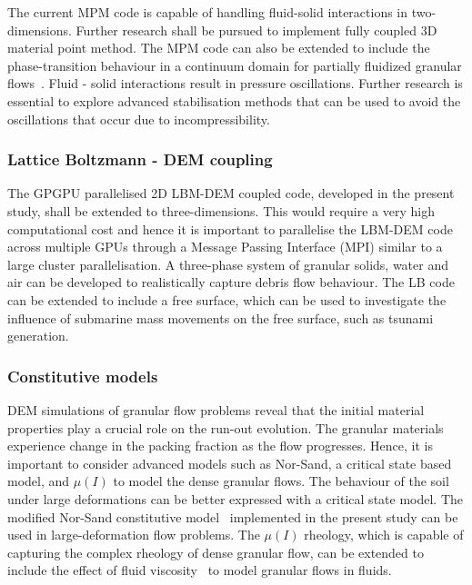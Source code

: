 The current MPM code is capable of handling fluid-solid interactions in 
two-dimensions. Further research shall be pursued to implement fully coupled 3D 
material point method. The MPM code can also be extended to include the 
phase-transition behaviour in a continuum domain for partially fluidized 
granular flows~\citep{Aranson2002, Aranson2001, Volfson2003}. Fluid - solid 
interactions result in pressure oscillations. Further research is essential to 
explore advanced stabilisation methods that can be used to avoid the 
oscillations that occur due to incompressibility.

\subsubsection*{Lattice Boltzmann - DEM coupling}

The GPGPU parallelised 2D LBM-DEM coupled code, developed in the present study, 
shall be extended to 
three-dimensions. This would require a very high computational cost and hence 
it is important to parallelise the LBM-DEM code across multiple GPUs through a 
Message Passing Interface (MPI) similar to a large cluster parallelisation. A 
three-phase system of granular solids, water and air can be developed to 
realistically capture debris flow behaviour. The LB code can be extended to 
include a free surface, which can be used to investigate the influence of 
submarine mass movements on the free surface, such as tsunami generation.

\subsubsection*{Constitutive models}

DEM simulations of granular flow problems reveal that the initial material 
properties play a crucial role on the run-out evolution. The granular materials 
experience change in the packing fraction as the flow progresses. Hence, it is 
important to consider advanced models such as Nor-Sand, a critical state based 
model, and $\mu(I)$  to model the dense granular flows. The behaviour of the 
soil under large deformations can be better expressed with a critical state 
model. The modified Nor-Sand constitutive model~\citep{Robert2010} implemented 
in the present study can be used in large-deformation flow problems. The 
$\mu(I)$ rheology, which is capable of capturing the complex rheology of dense 
granular flow, can be extended to include the effect of fluid 
viscosity~\citep{Pouliquen2005} to model granular flows in fluids. 


